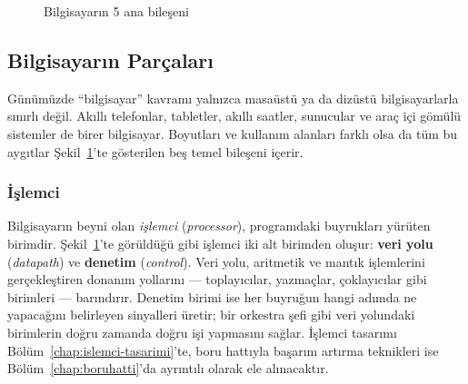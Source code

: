 \begin{figure}[H]
\vspace{-2mm}
\caption{Bilgisayarın 5 ana bileşeni}
\label{fig:bes-bilesen}
\end{figure}

\subsection{Bilgisayarın Parçaları}
\label{sec:bilgisayar-parcalari}

Günümüzde ``bilgisayar'' kavramı yalnızca masaüstü ya da dizüstü bilgisayarlarla sınırlı değil. Akıllı telefonlar, tabletler, akıllı saatler, sunucular ve araç içi gömülü sistemler de birer bilgisayar. Boyutları ve kullanım alanları farklı olsa da tüm bu aygıtlar Şekil~\ref{fig:bes-bilesen}'te gösterilen beş temel bileşeni içerir.

\subsubsection*{İşlemci}
Bilgisayarın beyni olan \emph{işlemci} (\emph{processor}), programdaki buyrukları yürüten birimdir. Şekil~\ref{fig:bes-bilesen}'te görüldüğü gibi işlemci iki alt birimden oluşur: \textbf{veri yolu} (\emph{datapath}) ve \textbf{denetim} (\emph{control}). Veri yolu, aritmetik ve mantık işlemlerini gerçekleştiren donanım yollarını --- toplayıcılar, yazmaçlar, çoklayıcılar gibi birimleri --- barındırır. Denetim birimi ise her buyruğun hangi adımda ne yapacağını belirleyen sinyalleri üretir; bir orkestra şefi gibi veri yolundaki birimlerin doğru zamanda doğru işi yapmasını sağlar. İşlemci tasarımı Bölüm~\ref{chap:islemci-tasarimi}'te, boru hattıyla başarım artırma teknikleri ise Bölüm~\ref{chap:boruhatti}'da ayrıntılı olarak ele alınacaktır.

